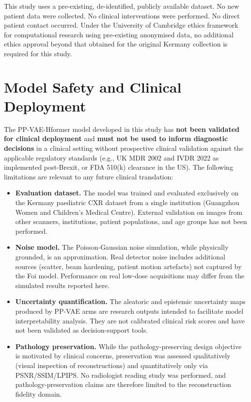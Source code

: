 \documentclass[12pt, a4paper, twoside, openright]{book}
\begin{document}
\begin{appendices}
This study uses a pre-existing, de-identified, publicly available dataset. No new patient data were collected. No clinical interventions were performed. No direct patient contact occurred. Under the University of Cambridge ethics framework for computational research using pre-existing anonymised data, no additional ethics approval beyond that obtained for the original Kermany collection is required for this study.

\section{Model Safety and Clinical Deployment}
\label{app:ethics:deployment}

The PP-VAE-Hformer model developed in this study has \textbf{not been validated for clinical deployment} and \textbf{must not be used to inform diagnostic decisions} in a clinical setting without prospective clinical validation against the applicable regulatory standards (e.g., UK MDR 2002 and IVDR 2022 as implemented post-Brexit, or FDA 510(k) clearance in the US). The following limitations are relevant to any future clinical translation:

\begin{itemize}
  \item \textbf{Evaluation dataset.} The model was trained and evaluated exclusively on the Kermany paediatric CXR dataset from a single institution (Guangzhou Women and Children's Medical Centre). External validation on images from other scanners, institutions, patient populations, and age groups has not been performed.
  \item \textbf{Noise model.} The Poisson-Gaussian noise simulation, while physically grounded, is an approximation. Real detector noise includes additional sources (scatter, beam hardening, patient motion artefacts) not captured by the Foi model. Performance on real low-dose acquisitions may differ from the simulated results reported here.
  \item \textbf{Uncertainty quantification.} The aleatoric and epistemic uncertainty maps produced by PP-VAE arms are research outputs intended to facilitate model interpretability analysis. They are not calibrated clinical risk scores and have not been validated as decision-support tools.
  \item \textbf{Pathology preservation.} While the pathology-preserving design objective is motivated by clinical concerns, preservation was assessed qualitatively (visual inspection of reconstructions) and quantitatively only via PSNR/SSIM/LPIPS. No radiologist reading study was performed, and pathology-preservation claims are therefore limited to the reconstruction fidelity domain.
\end{itemize}


\end{appendices}
\end{document}
